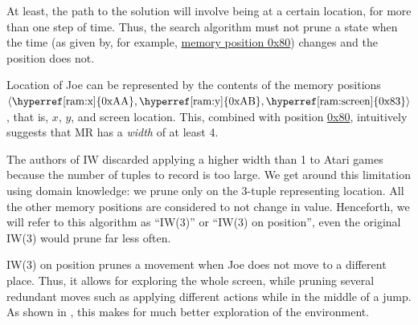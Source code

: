 At least, the path to the solution will involve being at a certain location, for
more than one step of time. Thus, the search algorithm must not prune a state
when the time (as given by, for example, \hyperref[ram:frame]{memory position 0x80})
changes and the position does not.

\newcommand{\ram}[2]{\hyperref[ram:#1]{#2}}

Location of Joe can be represented by the contents of the memory positions
$\langle\text{\hyperref[ram:x]{0xAA}},
\text{\hyperref[ram:y]{0xAB}},
\text{\hyperref[ram:screen]{0x83}}\rangle$,
that is, $x$, $y$, and screen location. This, combined with position
\hyperref[ram:frame]{0x80}, intuitively suggests that \ac{MR} has a \emph{width}
of at least 4.

The authors of \ac{IW} discarded applying a higher width than 1 to Atari games
because the number of tuples to record is too large. We get around this limitation
using domain knowledge: we prune only on the 3-tuple representing location. All
the other memory positions are considered to not change in value. Henceforth, we
will refer to this algorithm as ``\ac{IW}(3)'' or ``\ac{IW}(3) on position'',
even the original \ac{IW}(3) would prune far less often.

\ac{IW}(3) on position prunes a movement when Joe does not move to a different
place. Thus, it allows for exploring the whole screen, while pruning several
redundant moves such as applying different actions while in the middle of a jump.
As shown in , this makes for much better exploration of the
environment.

